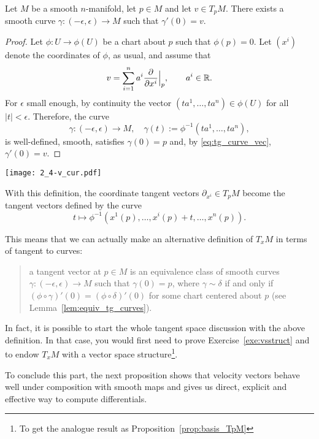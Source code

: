\begin{theorem}
  Let $M$ be a smooth $n$-manifold, let $p\in M$ and let $v\in T_pM$.
  There exists a smooth curve $\gamma: (-\epsilon,\epsilon) \to M$ such that $\gamma'(0) = v$.
\end{theorem}
\begin{proof}
  Let $\phi:U\to\phi(U)$ be a chart about $p$ such that $\phi(p)=0$.
  Let $(x^i)$ denote the coordinates of $\phi$, as usual, and assume that
  \begin{equation}
    v = \sum_{i=1}^n a^i \frac{\partial}{\partial x^i}\Big|_p, \qquad a^i \in\mathbb{R}.
  \end{equation}
  For $\epsilon$ small enough, by continuity the vector $(ta^1, \ldots, ta^n) \in \phi(U)$ for all $|t|<\epsilon$. Therefore, the curve
  \begin{equation}
    \gamma: (-\epsilon, \epsilon) \to M, \quad \gamma(t):=\phi^{-1}(ta^1, \ldots, ta^n),
  \end{equation}
  is well-defined, smooth, satisfies $\gamma(0) = p$ and, by \eqref{eq:tg_curve_vec}, $\gamma'(0) = v$.
\end{proof}

\begin{marginfigure}
  \texttt{[image: 2\_4-v\_cur.pdf]}
  \caption{With this definition, the coordinate tangent vectors $\partial_{x^i}\in T_p M$ become the tangent vectors defined by the curve \[t \mapsto \phi^{-1}(x^1(p), \ldots, {x^i(p) + t}, \ldots, x^n(p)).\]}
  \label{fig:2_4-v_cur}
\end{marginfigure}
This means that we can actually make an alternative definition of $T_xM$ in terms of tangent to curves:
\begin{quote}
  a tangent vector at $p\in M$ is an equivalence class of smooth curves $\gamma:(-\epsilon, \epsilon)\to M$ such that $\gamma(0)=p$, where $\gamma\sim\delta$ if and only if $(\phi\circ \gamma)'(0) = (\phi\circ\delta)'(0)$ for some chart centered about $p$ (see Lemma~\ref{lem:equiv_tg_curves}).
\end{quote}

In fact, it is possible to start the whole tangent space discussion with the above definition. In that case, you would first need to prove Exercise~\ref{exe:vsstruct} and to endow $T_xM$ with a vector space structure\footnote{To get the analogue result as Proposition~\ref{prop:basis_TpM}}.

To conclude this part, the next proposition shows that velocity vectors behave well under composition with smooth maps and gives us direct, explicit and effective way to compute differentials.

